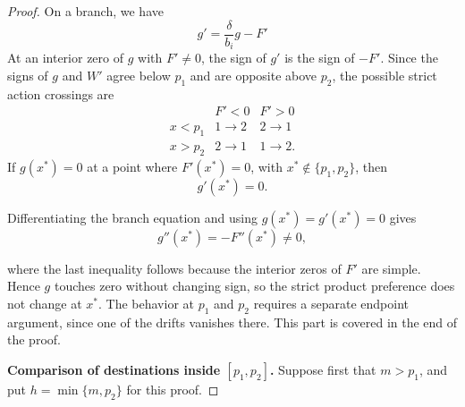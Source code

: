 \documentclass[11pt]{article}
\begin{document}
\begin{proof}
On a branch, we have 
\begin{equation*}
 g'=\frac{\delta}{b_i}g-F'
\end{equation*}
At an interior zero of $g$ with $F'\ne0$, the sign of $g'$ is the sign of
$-F'$. Since the signs of $g$ and $W'$ agree below $p_1$ and are opposite
above $p_2$, the possible strict action crossings are
\begin{equation*}
\begin{array}{c|cc}
 &F'<0&F'>0\\ \hline
 x<p_1&1\to2&2\to1\\
 x>p_2&2\to1&1\to2.
\end{array}
\tag{*}
\end{equation*}
If $g(x^*)=0$ at a point where $F'(x^*)=0$, with
$x^*\notin\{p_1,p_2\}$, then
\begin{equation*}
g'(x^*)=0.
\end{equation*}

Differentiating the branch equation and using $g(x^*)=g'(x^*)=0$ gives
\begin{equation*}
g''(x^*)=-F''(x^*)\neq0,
\end{equation*}

where the last inequality follows because the interior zeros of $F'$ are simple. Hence $g$ touches zero without changing sign, so the strict product preference does not change at $x^*$. The behavior at $p_1$ and $p_2$ requires a separate endpoint argument, since one of the drifts vanishes there. This part is covered in the end of the proof.

\medskip\noindent\textbf{Comparison of destinations inside $[p_1,p_2]$.}
Suppose first that $m>p_1$, and put $h=\min\{m,p_2\}$ for this proof. 




\end{proof}
\end{document}
